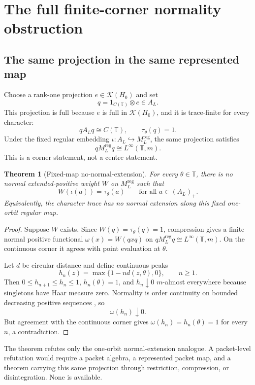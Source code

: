 \documentclass[11pt]{article}
\newtheorem{theorem}{Theorem}[section]
\theoremstyle{definition}
\newcommand{\T}{\mathbb{T}}
\newcommand{\K}{\mathcal{K}}
\begin{document}
\section{The full finite-corner normality obstruction}\label{sec:corner}

\subsection{The same projection in the same represented map}

Choose a rank-one projection \(e\in\K(H_0)\) and set
\[
 q=1_{C(\T)}\otimes e\in A_L.
\]
This projection is full because \(e\) is full in \(\K(H_0)\), and it is trace-finite for every character:
\[
 qA_Lq\cong C(\T),\qquad \tau_\theta(q)=1.
\]
Under the fixed regular embedding \(\iota:A_L\hookrightarrow M_L^{\mathrm{reg}}\), the same projection satisfies
\[
 qM_L^{\mathrm{reg}}q\cong L^\infty(\T,m).
\]
This is a corner statement, not a centre statement.

\begin{theorem}[Fixed-map no-normal-extension]\label{thm:normal}
For every \(\theta\in\T\), there is no normal extended-positive weight \(W\) on \(M_L^{\mathrm{reg}}\) such that
\[
 W(\iota(a))=\tau_\theta(a)\qquad\text{for all }a\in(A_L)_+.
\]
Equivalently, the character trace has no normal extension along this fixed one-orbit regular map.
\end{theorem}

\begin{proof}
Suppose \(W\) exists.  Since \(W(q)=\tau_\theta(q)=1\), compression gives a finite normal positive functional \(\omega(x)=W(qxq)\) on \(qM_L^{\mathrm{reg}}q\cong L^\infty(\T,m)\).  On the continuous corner it agrees with point evaluation at \(\theta\).

Let \(d\) be circular distance and define continuous peaks
\[
 h_n(z)=\max\{1-n d(z,\theta),0\},\qquad n\ge1.
\]
Then \(0\le h_{n+1}\le h_n\le1\), \(h_n(\theta)=1\), and \(h_n\downarrow0\) \(m\)-almost everywhere because singletons have Haar measure zero.  Normality is order continuity on bounded decreasing positive sequences \cite[Definition~7.1.2 and Theorem~7.1.3, pp.~43--44]{Jones2009}, so
\[
 \omega(h_n)\downarrow0.
\]
But agreement with the continuous corner gives \(\omega(h_n)=h_n(\theta)=1\) for every \(n\), a contradiction.
\end{proof}

The theorem refutes only the one-orbit normal-extension analogue.  A packet-level refutation would require a packet algebra, a represented packet map, and a theorem carrying this same projection through restriction, compression, or disintegration.  None is available.
\end{document}
